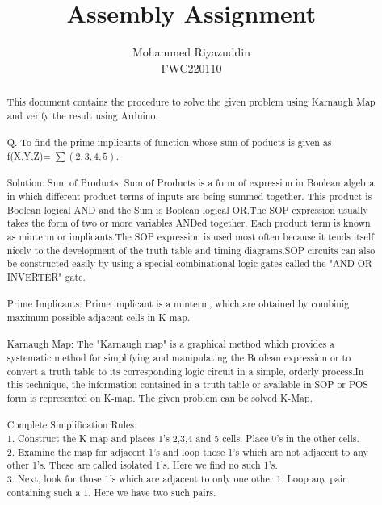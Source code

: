 \documentclass{IEEEtran}
\begin{document}
\title{Assembly Assignment}
\author{Mohammed Riyazuddin 
\\ FWC220110}
 \maketitle
 \begin{abstract}
  This document contains the procedure to solve the given problem using Karnaugh Map and verify the result using Arduino.
  \\
  \\Q. To find the prime implicants of function whose sum of poducts is given as f(X,Y,Z)= $\sum (2,3,4,5) $.
 \\
 \\Solution: 
Sum of Products: Sum of Products is a form of expression in Boolean algebra in which different product terms of inputs are being summed together. This product is Boolean logical AND and the Sum is Boolean logical OR.The SOP expression usually takes the form of two or more variables ANDed together. Each product term is known as minterm or implicants.The SOP expression is used most often because it tends itself nicely to the development of the truth table and timing diagrams.SOP circuits can also be constructed easily by using a special combinational logic gates called the "AND-OR-INVERTER" gate.
\\    
\\Prime Implicants: Prime implicant is a minterm, which are obtained by combinig maximum possible adjacent cells in K-map.
\\
\\ Karnaugh Map: The "Karnaugh map" is a graphical method which provides a systematic method for simplifying and manipulating the Boolean expression or to convert a truth table to its corresponding logic circuit in a simple, orderly process.In this technique, the information contained in a truth table or available in SOP or POS form is represented on K-map. The given problem can be solved K-Map.
\\ 
\\ Complete Simplification Rules:
\\1. Construct the K-map and places 1's 2,3,4 and 5 cells. Place 0's in the other cells.
\\2. Examine the map for adjacent 1's and loop those 1's which are not adjacent to any other 1's. These are called isolated 1's. Here we find no such 1's.
 \\3. Next, look for those 1's which are adjacent to only one other 1. Loop any pair containing such a 1. Here we have two such pairs.

\end{abstract}
\end{document}
